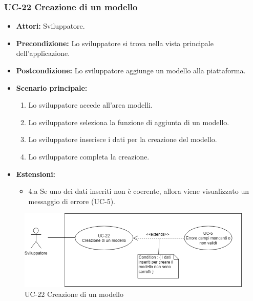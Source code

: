 	\subsubsection{UC-22 Creazione di un modello}		
		\begin{itemize}
			\item \textbf{Attori:} Sviluppatore.
			\item \textbf{Precondizione:} Lo sviluppatore si trova nella vista principale dell'applicazione.
			\item \textbf{Postcondizione:} Lo sviluppatore aggiunge un modello alla piattaforma.
			\item \textbf{Scenario principale:}
			\begin{enumerate}
				\item Lo sviluppatore accede all'area modelli.
				\item Lo sviluppatore seleziona la funzione di aggiunta di un modello.
				\item Lo sviluppatore inserisce i dati per la creazione del modello.
				\item Lo sviluppatore completa la creazione.
			\end{enumerate}
			\item \textbf{Estensioni:}
				\begin{itemize}
					\item 4.a Se uno dei dati inseriti non è coerente, allora viene visualizzato un messaggio di errore (UC-5).
				\end{itemize}
		\end{itemize}
		
		\begin{figure}[h]
			\centering
			\includegraphics[scale=0.7]{images/UC-22.png}
				\caption{UC-22 Creazione di un modello}
		\end{figure}	
